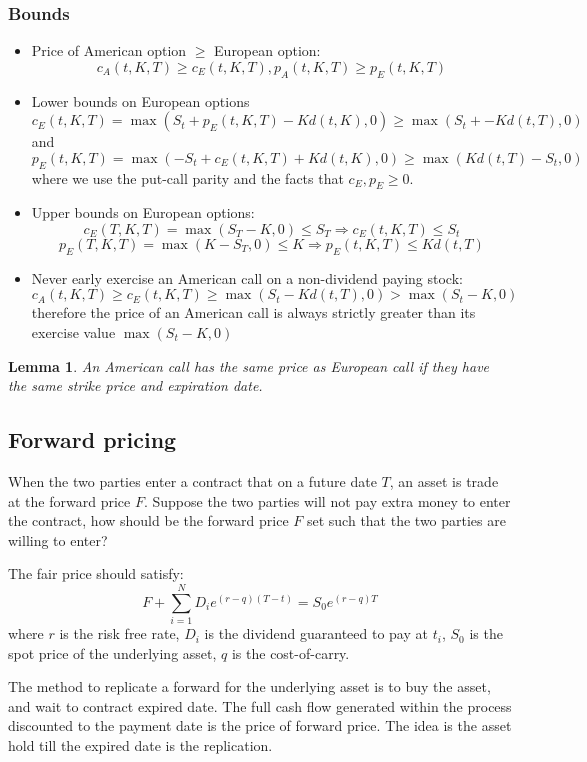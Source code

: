\documentclass[a4paper,13pt]{report}
\newtheorem{lemma}[theorem]{Lemma}
\begin{document}
\subsubsection{Bounds}
\begin{itemize}
    \item Price of American option $\geq$ European option:
    $$c_A(t,K,T) \geq c_E(t,K,T),p_A(t,K,T) \geq p_E(t,K,T)$$
    \item Lower bounds on European options 
    $$c_E(t,K,T) = \max(S_t+p_E(t,K,T)-Kd(t,K),0)\geq \max(S_t+-Kd(t,T),0)$$ and
    $$p_E(t,K,T) = \max(-S_t+c_E(t,K,T)+Kd(t,K),0)\geq \max(Kd(t,T)-S_t,0)$$
    where we use the put-call parity and the facts that $c_E,p_E \geq 0.$
    \item Upper bounds on European options:
    $$c_E(T,K,T) = \max(S_T-K,0) \leq S_T \Rightarrow c_E(t,K,T) \leq S_t $$
    $$p_E(T,K,T) = \max(K-S_T,0) \leq K \Rightarrow p_E(t,K,T) \leq Kd(t,T) $$
    \item Never early exercise an American call on a non-dividend paying stock:
    $$c_A(t,K,T) \geq c_E(t,K,T) \geq \max(S_t-Kd(t,T),0) > \max(S_t-K,0)$$
    therefore the price of an American call is always strictly greater than its exercise value $\max(S_t-K,0)$
\end{itemize}

\begin{lemma}
An American call has the same price as European call if they have the same strike price and expiration date. 
\end{lemma}

\subsection{Forward pricing}
When the two parties enter a contract that on a future date $T$, an asset is trade at the forward price $F$. Suppose the two parties will not pay extra money to enter the contract, how should be the forward price $F$ set such that the two parties are willing to enter?

The fair price should satisfy:
$$F+\sum_{i=1}^N D_i e^{(r-q)(T-t)} = S_0 e^{(r-q)T}$$
where $r$ is the risk free rate, $D_i$ is the dividend guaranteed to pay at $t_i$, $S_0$ is the spot price of the underlying asset, $q$ is the cost-of-carry.

The method to replicate a forward for the underlying asset is to buy the asset, and wait to contract expired date. The full cash flow generated within the process discounted to the payment date is the price of forward price. The idea is the asset hold till the expired date is the replication. \cite{wiki:forwardprice}
\end{document}
